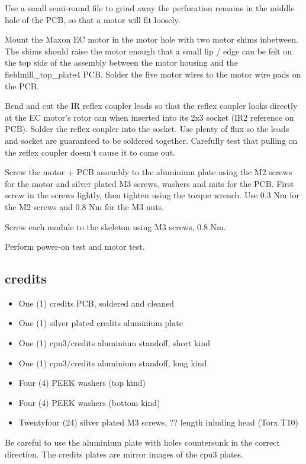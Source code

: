 \documentclass{article}
\begin{document}
Use a small semi-round file to grind away the perforation remains in the middle hole of the PCB,
so that a motor will fit loosely.

Mount the Maxon EC motor in the motor hole with two motor shims inbetween.
The shims should raise the motor enough that a small lip / edge can be felt on the top side of the assembly between the motor housing and the fieldmill\_top\_plate4 PCB.
Solder the five motor wires to the motor wire pads on the PCB.

Bend and cut the IR reflex coupler leads so that the reflex coupler looks directly at the EC motor's rotor can when inserted into its 2x3 socket (IR2 reference on PCB).
Solder the reflex coupler into the socket. Use plenty of flux so the leads and socket are guaranteed to be soldered together.
Carefully test that pulling on the reflex coupler doesn't cause it to come out.

Screw the motor + PCB assembly to the aluminium plate using the M2 screws for the motor and silver plated M3 screws, washers and nuts for the PCB.
First screw in the screws lightly, then tighten using the torque wrench. Use 0.3 Nm for the M2 screws and 0.8 Nm for the M3 nuts.

Screw each module to the skeleton using M3 screws, 0.8 Nm.

Perform power-on test and motor test.

\subsection{credits}

\begin{itemize}
\item One (1) credits PCB, soldered and cleaned
\item One (1) silver plated credits aluminium plate
\item One (1) cpu3/credits aluminium standoff, short kind
\item One (1) cpu3/credits aluminium standoff, long kind
\item Four (4) PEEK washers (top kind)
\item Four (4) PEEK washers (bottom kind)
\item Twentyfour (24) silver plated M3 screws, ?? length inluding head (Torx T10)
\end{itemize}

Be careful to use the aluminium plate with holes countersunk in the correct direction.
The credits plates are mirror images of the cpu3 plates.
\end{document}
